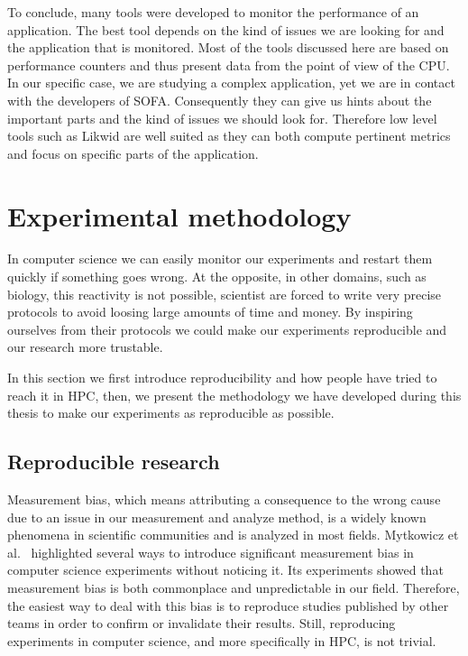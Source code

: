 To conclude, many tools were developed to monitor the performance of an application.
The best tool depends on the kind of issues we are looking for and the application that is monitored.
Most of the tools discussed here are based on performance counters and thus present data from the point of view of the \gls{CPU}.
In our specific case, we are studying a complex application, yet we are in contact with the developers of \gls{SOFA}.
Consequently they can give us hints about the important parts and the kind of issues we should look for.
Therefore low level tools such as \gls{Likwid} are well suited as they can both compute pertinent metrics and focus on specific parts of the application.

\section{Experimental methodology}
\label{sec:expe-methodo}

In computer science we can easily monitor our experiments and restart them quickly if something goes wrong.
At the opposite, in other domains, such as biology,  this reactivity is not possible, scientist are forced to write very precise protocols to avoid loosing large amounts of time and money.
By inspiring ourselves from their protocols we could make our experiments reproducible and our research more trustable.

In this section we first introduce reproducibility and how people have tried to reach it in \gls{HPC}, then, we present the methodology we have developed during this thesis to make our experiments as reproducible as possible.


\subsection{Reproducible research}

Measurement bias, which means attributing a consequence to the wrong cause due to an issue in our measurement and analyze method, is a widely known phenomena in scientific communities and is analyzed in most fields.
Mytkowicz et al.~\cite{Mytkowicz09Producing} highlighted several ways to introduce significant measurement bias in computer science experiments without noticing it.
Its experiments showed that measurement bias is both commonplace and unpredictable in our field.
Therefore, the easiest way to deal with this bias is to reproduce studies published by other teams in order to confirm or invalidate their results.
Still, reproducing experiments in computer science, and more specifically in \gls{HPC}, is not trivial.

